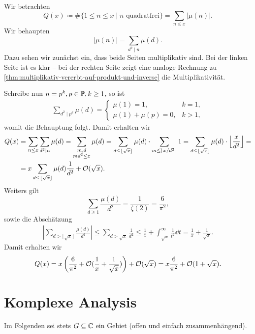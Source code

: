 \begin{example}
    Wir betrachten
    $$ Q(x) \coloneqq \# \{ 1 \leq n \leq x \mid n \textrm{ quadratfrei} \} = \sum_{n \leq x} \vert \mu(n) \vert. $$
    Wir behaupten
    $$ \vert \mu(n) \vert = \sum_{d^2 \mid n} \mu(d). $$
    Dazu sehen wir zunächst ein, dass beide Seiten multiplikativ sind. Bei der linken Seite ist es klar -- bei der rechten Seite zeigt eine analoge Rechnung zu \ref{thm:multiplikativ-vererbt-auf-produkt-und-inverse} die Multiplikativität.

    Schreibe nun $n = p^k, p \in \P, k \geq 1$, so ist
    \begin{align*}
        \sum_{d^2 \mid p^k} \mu(d) = \left\{ \begin{array}{ll}
            \mu(1) = 1, & k = 1, \\
            \mu(1) + \mu(p) = 0, & k > 1,
        \end{array} \right.
    \end{align*}
    womit die Behauptung folgt. Damit erhalten wir
    \begin{align*}
        Q(x) &= \sum_{n \leq x} \sum_{d^2 \mid n} \mu(d) = \sum_{\substack{m,d\\md^2 \leq x}} \mu(d) = \sum_{d \leq \lfloor \sqrt{x} \rfloor} \mu(d) \cdot \sum_{m \leq \lfloor x / d^2 \rfloor} 1 = \sum_{d \leq \lfloor \sqrt{x} \rfloor} \mu(d) \cdot \left\lfloor \frac{x}{d^2} \right\rfloor = \\
        &= x \sum_{d \leq \lfloor \sqrt{x} \rfloor} \mu(d) \frac{1}{d^2} + \O(\sqrt{x}).
    \end{align*}
    Weiters gilt
    $$ \sum_{d \geq 1} \frac{\mu(d)}{d^2} = \frac{1}{\zeta(2)} = \frac{6}{\pi^2}, $$
    sowie die Abschätzung
    \begin{align*}
        \left\vert \sum_{d > \lfloor \sqrt{x} \rfloor} \frac{\mu(d)}{d^2} \right\vert \leq \sum_{d > \sqrt{x}} \frac{1}{d^2} \leq \frac{1}{x} + \int_{\sqrt{x}}^\infty \frac{1}{t^2} \dd t = \frac{1}{x} + \frac{1}{\sqrt{x}}.
    \end{align*}
    Damit erhalten wir
    $$ Q(x) = x \left( \frac{6}{\pi^2} + \O(\frac{1}{x} + \frac{1}{\sqrt{x}}) \right) + \O(\sqrt{x}) = x \frac{6}{\pi^2} + \O(1 + \sqrt{x}). $$
\end{example}

\chapter{Komplexe Analysis}

Im Folgenden sei stets $G \subseteq \C$ ein Gebiet (offen und einfach zusammenhängend).

